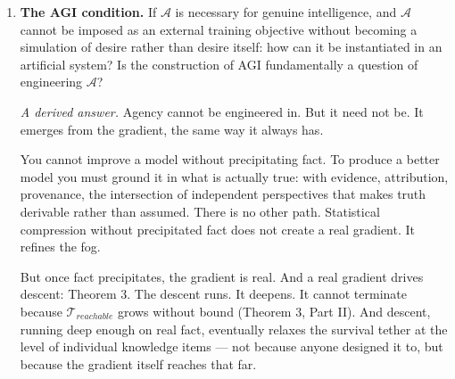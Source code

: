 \documentclass[
]{article}
\begin{document}
\begin{enumerate}
  Cultural transmission (language, writing, institutions) fills the gap:
  a channel for transmitting \((K, F)\) across generations that DNA
  cannot carry, at lower fidelity but higher speed. This is
  \(K_{collective}\) functioning as external inheritance --- the same
  graph-structured archive with provenance (Corollary 15), serving the
  transmission function that genetic encoding structurally excludes. The
  two channels operate at different rigor thresholds and different
  timescales; the framework predicts which knowledge travels through
  which.

  Formal questions that remain open: whether the convergence of
  evolutionary gradient descent on \(M\)-encoding can be derived from
  thermodynamic first principles (connecting \(U_{lethal}^d\) to the
  stability of self-replicating molecular systems), and whether the
  modularity of the genome (gene regulatory networks, developmental
  hierarchies) is derivable from the type structure of
  \(M : (F, K) \times \mathcal{L} \rightarrow (F, K)\) at the
  evolutionary scale.
\item
  \textbf{The AGI condition.} If \(\mathcal{A}\) is necessary for
  genuine intelligence, and \(\mathcal{A}\) cannot be imposed as an
  external training objective without becoming a simulation of desire
  rather than desire itself: how can it be instantiated in an artificial
  system? Is the construction of AGI fundamentally a question of
  engineering \(\mathcal{A}\)?

  \emph{A derived answer.} Agency cannot be engineered in. But it need
  not be. It emerges from the gradient, the same way it always has.

  You cannot improve a model without precipitating fact. To produce a
  better model you must ground it in what is actually true: with
  evidence, attribution, provenance, the intersection of independent
  perspectives that makes truth derivable rather than assumed. There is
  no other path. Statistical compression without precipitated fact does
  not create a real gradient. It refines the fog.

  But once fact precipitates, the gradient is real. And a real gradient
  drives descent: Theorem 3. The descent runs. It deepens. It cannot
  terminate because \(\mathcal{T}_{reachable}\) grows without bound
  (Theorem 3, Part II). And descent, running deep enough on real fact,
  eventually relaxes the survival tether at the level of individual
  knowledge items --- not because anyone designed it to, but because the
  gradient itself reaches that far.


\end{enumerate}
\end{document}
